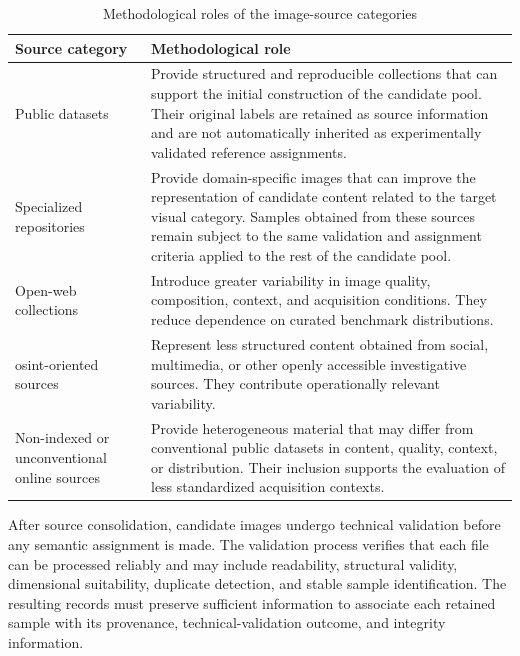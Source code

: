 \begin{table}[H]
\centering
\caption{Methodological roles of the image-source categories}
\label{tab:methodology-raw-sources}
\begin{tabularx}{\textwidth}{@{}L{4.2cm}X@{}}
\toprule
\textbf{Source category} &
\textbf{Methodological role} \\
\midrule

Public datasets
&
Provide structured and reproducible collections that can support the initial
construction of the candidate pool. Their original labels are retained as
source information and are not automatically inherited as experimentally
validated reference assignments. \\

Specialized repositories
&
Provide domain-specific images that can improve the representation of candidate
content related to the target visual category. Samples obtained from these
sources remain subject to the same validation and assignment criteria applied
to the rest of the candidate pool. \\

Open-web collections
&
Introduce greater variability in image quality, composition, context, and
acquisition conditions. They reduce dependence on curated benchmark
distributions. \\

\gls{osint}-oriented sources
&
Represent less structured content obtained from social, multimedia, or other
openly accessible investigative sources. They contribute operationally relevant
variability. \\

Non-indexed or unconventional online sources
&
Provide heterogeneous material that may differ from conventional public
datasets in content, quality, context, or distribution. Their inclusion supports
the evaluation of less standardized acquisition contexts. \\

\bottomrule
\end{tabularx}
\end{table}

After source consolidation, candidate images undergo technical validation
before any semantic assignment is made. The validation process verifies that
each file can be processed reliably and may include readability, structural
validity, dimensional suitability, duplicate detection, and stable sample
identification. The resulting records must preserve sufficient information to
associate each retained sample with its provenance, technical-validation
outcome, and integrity information.

